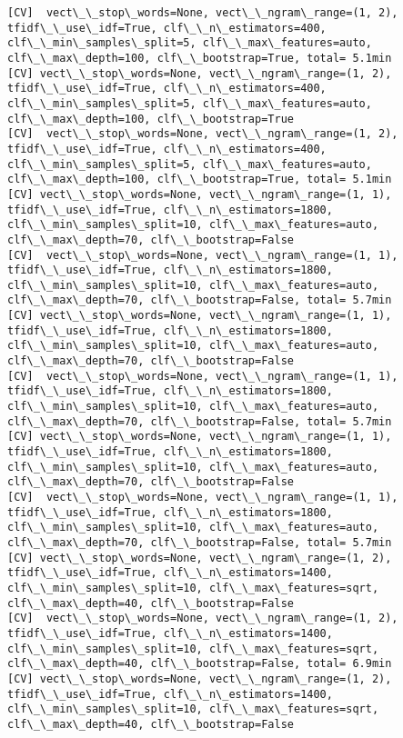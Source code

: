 \documentclass[11pt]{article}
\begin{document}
\begin{Verbatim}[commandchars=\\\{\}]
[CV]  vect\_\_stop\_words=None, vect\_\_ngram\_range=(1, 2), tfidf\_\_use\_idf=True, clf\_\_n\_estimators=400, clf\_\_min\_samples\_split=5, clf\_\_max\_features=auto, clf\_\_max\_depth=100, clf\_\_bootstrap=True, total= 5.1min
[CV] vect\_\_stop\_words=None, vect\_\_ngram\_range=(1, 2), tfidf\_\_use\_idf=True, clf\_\_n\_estimators=400, clf\_\_min\_samples\_split=5, clf\_\_max\_features=auto, clf\_\_max\_depth=100, clf\_\_bootstrap=True 
[CV]  vect\_\_stop\_words=None, vect\_\_ngram\_range=(1, 2), tfidf\_\_use\_idf=True, clf\_\_n\_estimators=400, clf\_\_min\_samples\_split=5, clf\_\_max\_features=auto, clf\_\_max\_depth=100, clf\_\_bootstrap=True, total= 5.1min
[CV] vect\_\_stop\_words=None, vect\_\_ngram\_range=(1, 1), tfidf\_\_use\_idf=True, clf\_\_n\_estimators=1800, clf\_\_min\_samples\_split=10, clf\_\_max\_features=auto, clf\_\_max\_depth=70, clf\_\_bootstrap=False 
[CV]  vect\_\_stop\_words=None, vect\_\_ngram\_range=(1, 1), tfidf\_\_use\_idf=True, clf\_\_n\_estimators=1800, clf\_\_min\_samples\_split=10, clf\_\_max\_features=auto, clf\_\_max\_depth=70, clf\_\_bootstrap=False, total= 5.7min
[CV] vect\_\_stop\_words=None, vect\_\_ngram\_range=(1, 1), tfidf\_\_use\_idf=True, clf\_\_n\_estimators=1800, clf\_\_min\_samples\_split=10, clf\_\_max\_features=auto, clf\_\_max\_depth=70, clf\_\_bootstrap=False 
[CV]  vect\_\_stop\_words=None, vect\_\_ngram\_range=(1, 1), tfidf\_\_use\_idf=True, clf\_\_n\_estimators=1800, clf\_\_min\_samples\_split=10, clf\_\_max\_features=auto, clf\_\_max\_depth=70, clf\_\_bootstrap=False, total= 5.7min
[CV] vect\_\_stop\_words=None, vect\_\_ngram\_range=(1, 1), tfidf\_\_use\_idf=True, clf\_\_n\_estimators=1800, clf\_\_min\_samples\_split=10, clf\_\_max\_features=auto, clf\_\_max\_depth=70, clf\_\_bootstrap=False 
[CV]  vect\_\_stop\_words=None, vect\_\_ngram\_range=(1, 1), tfidf\_\_use\_idf=True, clf\_\_n\_estimators=1800, clf\_\_min\_samples\_split=10, clf\_\_max\_features=auto, clf\_\_max\_depth=70, clf\_\_bootstrap=False, total= 5.7min
[CV] vect\_\_stop\_words=None, vect\_\_ngram\_range=(1, 2), tfidf\_\_use\_idf=True, clf\_\_n\_estimators=1400, clf\_\_min\_samples\_split=10, clf\_\_max\_features=sqrt, clf\_\_max\_depth=40, clf\_\_bootstrap=False 
[CV]  vect\_\_stop\_words=None, vect\_\_ngram\_range=(1, 2), tfidf\_\_use\_idf=True, clf\_\_n\_estimators=1400, clf\_\_min\_samples\_split=10, clf\_\_max\_features=sqrt, clf\_\_max\_depth=40, clf\_\_bootstrap=False, total= 6.9min
[CV] vect\_\_stop\_words=None, vect\_\_ngram\_range=(1, 2), tfidf\_\_use\_idf=True, clf\_\_n\_estimators=1400, clf\_\_min\_samples\_split=10, clf\_\_max\_features=sqrt, clf\_\_max\_depth=40, clf\_\_bootstrap=False 

\end{Verbatim}
\end{document}
